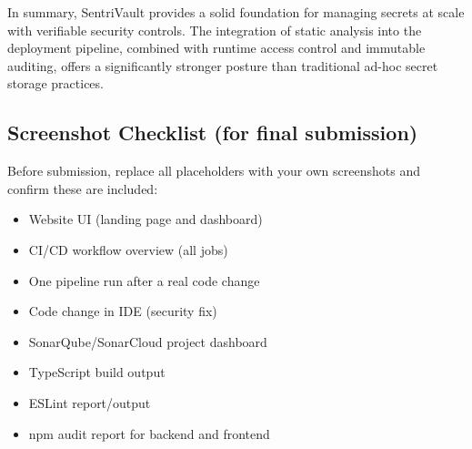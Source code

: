 \documentclass[conference]{IEEEtran}
\begin{document}
In summary, SentriVault provides a solid foundation for managing secrets at scale with verifiable security controls. The integration of static analysis into the deployment pipeline, combined with runtime access control and immutable auditing, offers a significantly stronger posture than traditional ad-hoc secret storage practices.

\subsection{Screenshot Checklist (for final submission)}

Before submission, replace all placeholders with your own screenshots and confirm these are included:

\begin{itemize}
  \item Website UI (landing page and dashboard)
  \item CI/CD workflow overview (all jobs)
  \item One pipeline run after a real code change
  \item Code change in IDE (security fix)
  \item SonarQube/SonarCloud project dashboard
  \item TypeScript build output
  \item ESLint report/output
  \item npm audit report for backend and frontend
\end{itemize}




\end{document}
